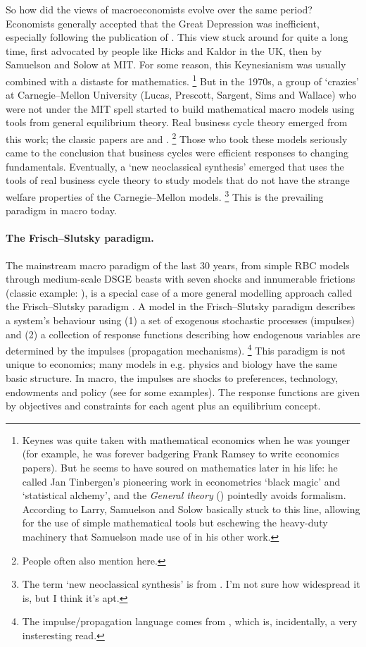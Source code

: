\documentclass[11pt,letterpaper,reqno,oneside]{article}
\begin{document}
So how did the views of macroeconomists evolve over the same period? Economists generally accepted that the Great Depression was inefficient, especially following the publication of \textcite{Keynes1936}. This view stuck around for quite a long time, first advocated by people like Hicks and Kaldor in the UK, then by Samuelson and Solow at MIT. For some reason, this Keynesianism was usually combined with a distaste for mathematics.%
	\footnote{Keynes was quite taken with mathematical economics when he was younger (for example, he was forever badgering Frank Ramsey to write economics papers). But he seems to have soured on mathematics later in his life: he called Jan Tinbergen's pioneering work in econometrics `black magic' and `statistical alchemy', and the \emph{General theory} (\citeyear{Keynes1936}) pointedly avoids formalism. According to Larry, Samuelson and Solow basically stuck to this line, allowing for the use of simple mathematical tools but eschewing the heavy-duty machinery that Samuelson made use of in his other work.}
But in the 1970s, a group of `crazies' at Carnegie--Mellon University (Lucas, Prescott, Sargent, Sims and Wallace) who were not under the MIT spell started to build mathematical macro models using tools from general equilibrium theory. Real business cycle theory emerged from this work; the classic papers are \textcite{LongPlosser1983} and \textcite{Prescott1986}.%
	\footnote{People often also mention \textcite{KydlandPrescott1982} here.}
Those who took these models seriously came to the conclusion that business cycles were efficient responses to changing fundamentals. Eventually, a `new neoclassical synthesis' emerged that uses the tools of real business cycle theory to study models that do not have the strange welfare properties of the Carnegie--Mellon models.%
	\footnote{The term `new neoclassical synthesis' is from \textcite{GoodfriendKing1997}. I'm not sure how widespread it is, but I think it's apt.}
This is the prevailing paradigm in macro today.


\paragraph{The Frisch--Slutsky paradigm.}
The mainstream macro paradigm of the last 30 years, from simple RBC models through medium-scale DSGE beasts with seven shocks and innumerable frictions (classic example: \textcite{SmetsWouters2007}), is a special case of a more general modelling approach called the Frisch--Slutsky paradigm \parencite{Frisch1933,Slutsky1937}. A model in the Frisch--Slutsky paradigm describes a system's behaviour using (1) a set of exogenous stochastic processes (impulses) and (2) a collection of response functions describing how endogenous variables are determined by the impulses (propagation mechanisms).%
	\footnote{The impulse/propagation language comes from \textcite{Frisch1933}, which is, incidentally, a very insteresting read.}
This paradigm is not unique to economics; many models in e.g. physics and biology have the same basic structure. In macro, the impulses are shocks to preferences, technology, endowments and policy (see \textcite{SmetsWouters2007} for some examples). The response functions are given by objectives and constraints for each agent plus an equilibrium concept.
\end{document}
